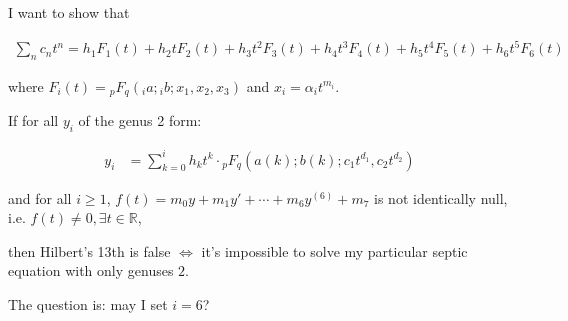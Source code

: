 \documentclass[12pt]{article}
\begin{document}
\vspace{5mm}

I want to show that

\begin{align}
\sum_n c_n t^n = h_1 F_1(t) + h_2 t F_2(t) + h_3 t^2 F_3(t) + h_4 t^3 F_4(t) + h_5 t^4 F_5(t) + h_6 t^5 F_6(t)
\end{align}

where $F_i(t) = {}_p F_q({}_ia; {}_ib; x_1, x_2, x_3)$ and $x_i = \alpha_i t^{m_i}$.

\vspace{5mm}

If for all $y_i$ of the genus 2 form: 

\begin{align}
y_i &= \sum_{k = 0}^i h_k t^k \cdot {}_{p} F_{q}(a(k); b(k); c_1 t^{d_1}, c_2 t^{d_2})
\end{align}

and for all $i \ge 1$, $f(t) = m_0 y + m_1 y' + \cdots + m_6 y^{(6)} + m_7$ is not identically null, i.e. $f(t) \ne 0, \exists t \in \mathbb{R}$,

then Hilbert's 13th is false $\Leftrightarrow$ it's impossible to solve my particular septic equation with only genuses $2$.

The question is: may I set $i = 6$?
\end{document}
